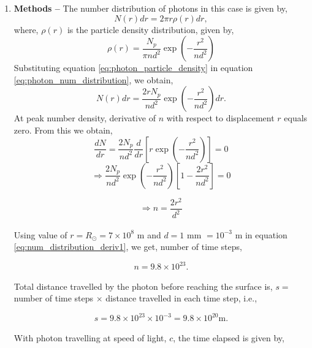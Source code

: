\documentclass[a4paper]{article}
\begin{document}
\begin{enumerate} [label*=\textbf{(\alph*)}]
			\item
				\subitem \textbf{Methods --}
					The number distribution of photons in this case is given by,
					\begin{equation}
						N(r) dr = 2 \pi r \rho (r) dr,
						\label{eq:photon_num_distribution}
					\end{equation}
					where, \(\rho (r)\) is the particle density distribution, given by,
					\begin{equation}
						\rho (r) = \frac{N_p^{}}{\pi n d^2_{}} \exp \left( - \frac{r^2_{}}{nd^2_{}} \right)
						\label{eq:photon_particle_density} 
					\end{equation}
					Substituting equation \ref{eq:photon_particle_density} in equation \ref{eq:photon_num_distribution}, we obtain,
					\[N(r)dr = \frac{2rN_p^{}}{nd^2_{}} \exp \left( - \frac{r^2_{}}{nd^2_{}} \right) dr.\]
					At peak number density, derivative of \(n\) with respect to displacement \(r\) equals zero. From this we obtain,
					\[\frac{dN}{dr} = \frac{2N_p^{}}{nd^2_{}} \frac{d}{dr} \left[ r \exp \left( - \frac{r^2_{}}{nd^2_{}} \right) \right] = 0 \]
					\[\Rightarrow \frac{2N_p}{nd^2_{}} \exp \left( - \frac{r^2_{}}{nd^2_{}} \right) \left[ 1- \frac{2r^2_{}}{nd^2_{}} \right] = 0 \]
					
					\begin{equation}
						\Rightarrow n = \frac{2r^2_{}}{d^2_{}}
						\label{eq:num_distribution_deriv1}
					\end{equation}
					
					Using value of \(r = R_\odot^{} = 7 \times 10^8_{}\) m and \(d=1\) mm \(=10^{-3}_{}\) m in equation \ref{eq:num_distribution_deriv1}, we get, number of time steps,
					
					\begin{equation}
						n = 9.8 \times 10^{23}_{}.
						\label{eq:num_distribution_value}
					\end{equation}
					
					Total distance travelled by the photon before reaching the surface is, \(s = \) number of time steps \(\times\) distance travelled in each time step, i.e.,
					
					\begin{equation}
						s = 9.8\times 10^{23}_{} \times 10^{-3} = 9.8 \times 10^{20} \text{m}.
					\end{equation}
					
					With photon travelling at speed of light, \(c\), the time elapsed is given by,
					

\end{enumerate}
\end{document}
